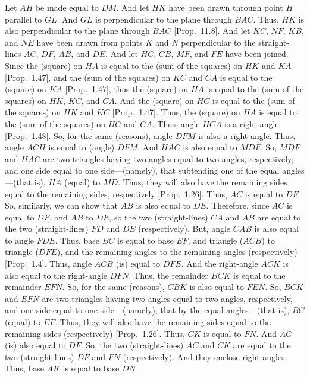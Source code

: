 Let $AH$ be made equal to $DM$. And let $HK$ have been drawn through
point $H$ parallel to $GL$. And $GL$  is perpendicular to the plane
through $BAC$. Thus, $HK$  is also perpendicular to the plane through
$BAC$ [Prop.~11.8]. And let  $KC$, $NF$, $KB$, and $NE$ have
been drawn from points $K$ and $N$ perpendicular to the straight-lines $AC$, $DF$,
$AB$, and $DE$. And let $HC$, $CB$, $MF$, and $FE$ have
been joined. Since the (square) on $HA$ is equal to the (sum of the squares)
on $HK$ and $KA$ [Prop.~1.47], 
and the (sum of the squares) on $KC$ and $CA$ is equal to the (square) on $KA$   [Prop.~1.47], thus the  (square) on $HA$ is equal to the (sum
of the squares) on $HK$, $KC$, and $CA$. And the (square) on $HC$ is equal to the (sum of
the squares) on $HK$ and $KC$  [Prop.~1.47].
Thus, the (square) on $HA$ is equal to the (sum of the squares) on $HC$ and
$CA$. Thus, angle $HCA$ is a right-angle [Prop.~1.48]. So, for the same (reasons), angle $DFM$ is also
a right-angle. Thus, angle $ACH$ is equal to (angle) $DFM$. And $HAC$
is also equal to $MDF$.  So, $MDF$ and $HAC$
are two triangles
having two angles equal to two angles, respectively, and one side
equal to one side---(namely), that subtending one of the equal angles ---(that is), $HA$ (equal) to $MD$. 
Thus, they will also have the remaining sides equal to the remaining sides, respectively [Prop.~1.26]. Thus, $AC$ is equal to $DF$. So, similarly, we can show that $AB$ is also equal to $DE$. 
Therefore, since $AC$ is equal to $DF$, and $AB$ to $DE$, so the two
(straight-lines) $CA$ and $AB$ are equal to the two (straight-lines)
$FD$ and $DE$ (respectively). But, angle
$CAB$ is also equal to angle $FDE$. Thus, base $BC$ is equal to base
$EF$, and triangle ($ACB$) to triangle ($DFE$), and the remaining angles
to the remaining angles (respectively) [Prop.~1.4].
Thus, angle  $ACB$ (is) equal to $DFE$. And the right-angle $ACK$
is also equal to the right-angle $DFN$. Thus, the remainder
$BCK$ is equal to the remainder $EFN$. So, for the same (reasons), 
$CBK$ is also equal to $FEN$. So, $BCK$ and $EFN$
are two triangles having two angles equal to two angles, respectively, 
and one side equal to one side---(namely), that by the equal angles---(that is), $BC$ (equal) to $EF$. Thus, they will also have the remaining
sides equal to the remaining sides (respectively) [Prop.~1.26]. Thus, $CK$ is equal to $FN$. And $AC$ (is) also
equal to $DF$. So, the two (straight-lines) $AC$ and $CK$
are equal to the two (straight-lines) $DF$ and $FN$ (respectively). 
And they enclose right-angles. Thus, base $AK$ is equal to base $DN$
